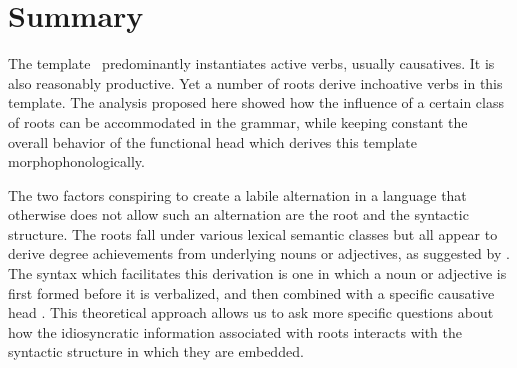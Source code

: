 \section{Summary} \label{vd:sum}
The template \thif~predominantly instantiates active verbs, usually causatives. It is also reasonably productive. Yet a number of roots derive inchoative verbs in this template. The analysis proposed here showed how the influence of a certain class of roots can be accommodated in the grammar, while keeping constant the overall behavior of the functional head which derives this template morphophonologically.

The two factors conspiring to create a labile alternation in a language that otherwise does not allow such an alternation are the root and the syntactic structure. The roots fall under various lexical semantic classes but all appear to derive degree achievements from underlying nouns or adjectives, as suggested by \cite{lev16}. The syntax which facilitates this derivation is one in which a noun or adjective is first formed before it is verbalized, and then combined with a specific causative head {\vd}. This theoretical approach allows us to ask more specific questions about how the idiosyncratic information associated with roots interacts with the syntactic structure in which they are embedded.





	


